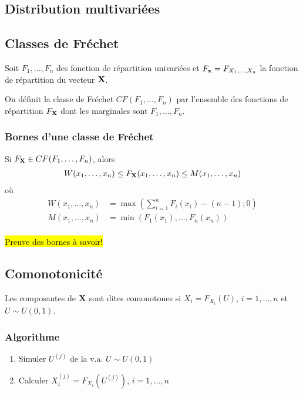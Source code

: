 \documentclass[10pt, french]{article}
\begin{document}
\begin{multicols*}{2} 
\section{Distribution multivariées}
\subsection{Classes de Fréchet}
Soit $F_1, \dots, F_n$ des fonction de répartition univariées et $F_{\mathbf{x}} = F_{X_1, \dots, X_n}$ la fonction de répartition du vecteur $\mathbf{X}$.

On définit la classe de Fréchet $CF(F_1, \dots, F_n)$ par l'ensemble des fonctions de répartition $F_{\mathbf{X}}$ dont les marginales sont $F_1, \dots, F_n$.

\subsubsection{Bornes d'une classe de Fréchet}
Si $F_{\mathbf{X}} \in CF(F_1, \dots, F_n)$, alors
\begin{align*}
W(x_1, \dots, x_n) \leq F_{\mathbf{X}}(x_1, \dots, x_n) \leq M(x_1, \dots, x_n)
\end{align*}
où
\begin{align*}
W(x_1, \dots, x_n)	& = \max \left (\sum_{i=1}^{n} F_i(x_i) - (n-1) ; 0 \right ) \\
M(x_1, \dots, x_n)	& = \min \left ( F_1(x_1), \dots, F_n(x_n) \right) \\
\end{align*}

\hl{Preuve des bornes à savoir!}


\subsection{Comonotonicité}
Les composantes de $\mathbf{X}$ sont dites comonotones si $X_i = F_{X_i}(U)$, $i = 1, \dots, n$ et $U \sim U(0,1)$.

\subsubsection{Algorithme}
\begin{enumerate}
\item Simuler $U^{(j)}$ de la v.a. $U \sim U(0,1)$
\item Calculer $X_i^{(j)} = F_{X_i}(U^{(j)})$, $i = 1, \dots, n$
\end{enumerate}


\end{multicols*}
\end{document}
